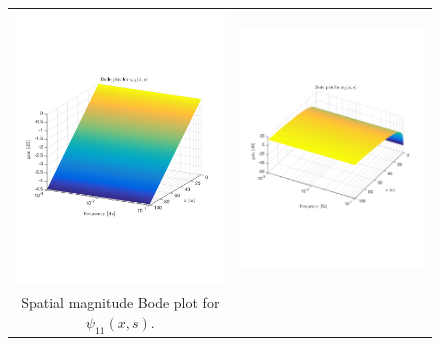 \documentclass[preprint]{elsarticle}
\begin{document}

\begin{figure}
\centering
\begin{tabular}{cc}
\includegraphics[trim = 0mm 60mm 0mm 60mm, width = 8cm]{Bode_free_flow/distr_vq_psi_11}
&
\includegraphics[trim = 0mm 60mm 0mm 60mm, width = 8cm]{Bode_free_flow/distr_vq_psi_12}
\tabularnewline
Spatial magnitude Bode plot for $\psi_{11}(x,s)$.

\end{tabular}
\end{figure}
\end{document}
